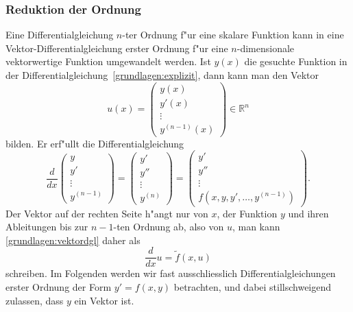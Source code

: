 \subsubsection{Reduktion der Ordnung}
%
%
Eine Differentialgleichung $n$-ter Ordnung f"ur eine skalare Funktion
kann in eine Vektor-Differen\-tialgleichung erster Ordnung f"ur eine
%
%
$n$-dimensionale vektorwertige Funktion umgewandelt werden.
Ist $y(x)$ die gesuchte Funktion in der
Differentialgleichung~\eqref{grundlagen:explizit}, dann kann man
den Vektor
\[
u(x)=\begin{pmatrix}
y(x)\\y'(x)\\\vdots\\y^{(n-1)}(x)
\end{pmatrix}
\in\mathbb R^n
\]
bilden.
Er erf"ullt die Differentialgleichung
\begin{equation}
\frac{d}{dx}\begin{pmatrix}
y\\y'\\\vdots\\y^{(n-1)}
\end{pmatrix}
=
\begin{pmatrix}
y'\\y''\\\vdots\\y^{(n)}
\end{pmatrix}
=
\begin{pmatrix}
y'\\y''\\\vdots\\f(x,y,y',\dots,y^{(n-1)})
\end{pmatrix}.
\label{grundlagen:vektordgl}
\end{equation}
Der Vektor auf der rechten Seite h"angt nur von $x$, der Funktion $y$
und ihren Ableitungen bis zur $n-1$-ten Ordnung ab, also von $u$, man
kann \eqref{grundlagen:vektordgl} daher als
\begin{equation}
\frac{d}{dx}u=\tilde{f}(x,u)
\end{equation}
schreiben.
Im Folgenden werden wir fast ausschliesslich Differentialgleichungen
erster Ordnung der Form $y'=f(x,y)$ betrachten, und dabei stillschweigend
zulassen, dass $y$ ein Vektor ist.

